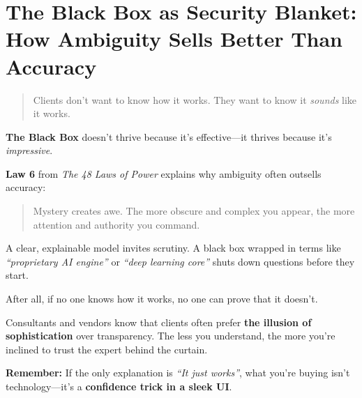 \section{The Black Box as Security Blanket: How Ambiguity Sells Better Than Accuracy}

\begin{quote}
Clients don’t want to know how it works. They want to know it \textit{sounds} like it works.
\end{quote}

  \textbf{The Black Box} doesn’t thrive because it’s effective—it thrives because it’s \textit{impressive}.
  
  \medskip
  
  \textbf{Law 6} from \textit{The 48 Laws of Power} explains why ambiguity often outsells accuracy:
  \begin{quote}
  Mystery creates awe. The more obscure and complex you appear, the more attention and authority you command.
  \end{quote}
  
  \medskip
  
  A clear, explainable model invites scrutiny. A black box wrapped in terms like \textit{``proprietary AI engine''} or \textit{``deep learning core''} shuts down questions before they start.
  
  \medskip
  
  After all, if no one knows how it works, no one can prove that it doesn’t.
  
  \medskip
  
  Consultants and vendors know that clients often prefer \textbf{the illusion of sophistication} over transparency.  The less you understand, the more you're inclined to trust the expert behind the curtain.
  
  \medskip
  
  \textbf{Remember:} If the only explanation is \textit{``It just works''}, what you're buying isn’t technology—it’s a \textbf{confidence trick in a sleek UI}.
  




